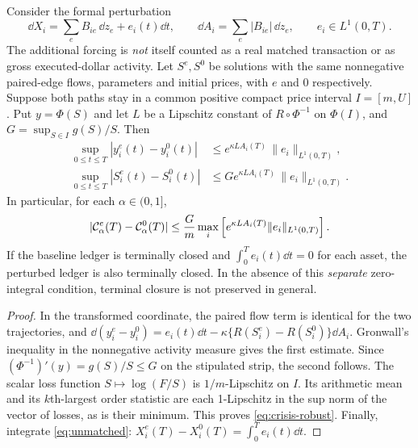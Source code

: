 \documentclass[review,hidelinks,onefignum,onetabnum]{siamonline250211}%
\begin{document}
\begin{proposition}
\label{prop:unmatched}
Consider the formal perturbation
\begin{equation}\label{eq:unmatched}
 \dd X_i=\sum_e B_{ie}\,\dd z_e+e_i(t)\dd t,
 \qquad\dd A_i=\sum_e|B_{ie}|\,\dd z_e,
 \qquad e_i\in L^1(0,T).
\end{equation}
The additional forcing is \emph{not} itself counted as a real matched
transaction or as gross executed-dollar activity. Let $S^e,S^0$ be
solutions with the same nonnegative paired-edge flows, parameters and
initial prices, with $e$ and $0$ respectively. Suppose both paths stay
in a common positive compact price interval $I=[m,U]$. Put
$y=\Phi(S)$ and let $L$ be a Lipschitz constant of
$R\circ\Phi^{-1}$ on $\Phi(I)$, and
$G=\sup_{S\in I}g(S)/S$. Then
\begin{align}
 \sup_{0\le t\le T}|y_i^e(t)-y_i^0(t)|
 &\le e^{\kappa L A_i(T)}\,\|e_i\|_{L^1(0,T)},\label{eq:robust}\\
 \sup_{0\le t\le T}|S_i^e(t)-S_i^0(t)|
 &\le G e^{\kappa L A_i(T)}\,\|e_i\|_{L^1(0,T)}.
 \label{eq:price-robust}
\end{align}
In particular, for each $\alpha\in(0,1]$,
\begin{equation}\label{eq:crisis-robust}
 |\mathcal{C}_\alpha^e(T)-\mathcal{C}_\alpha^0(T)|
 \le \frac{G}{m}\max_i
 \left[e^{\kappa L A_i(T)}\|e_i\|_{L^1(0,T)}\right].
\end{equation}
If the baseline ledger is terminally closed and
$\int_0^T e_i(t)\dd t=0$ for each asset, the perturbed ledger is
also terminally closed. In the absence of this \emph{separate}
zero-integral condition, terminal closure is not preserved in general.
\end{proposition}
\begin{proof}
In the transformed coordinate, the paired flow term is identical
for the two trajectories, and
$\dd(y_i^e-y_i^0)=e_i(t)\dd t
-\kappa\{R(S_i^e)-R(S_i^0)\}\dd A_i$.
Gronwall's inequality in the nonnegative activity measure gives
the first estimate. Since
$(\Phi^{-1})'(y)=g(S)/S\le G$ on the stipulated strip,
the second follows. The scalar loss function $S\mapsto\log(F/S)$
is $1/m$-Lipschitz on $I$. Its arithmetic mean and its
$k$th-largest order statistic are each 1-Lipschitz in the sup norm
of the vector of losses, as is their minimum. This proves
\eqref{eq:crisis-robust}. Finally, integrate \eqref{eq:unmatched}:
$X_i^e(T)-X_i^0(T)=\int_0^T e_i(t)\dd t$.
\end{proof}
\end{document}
